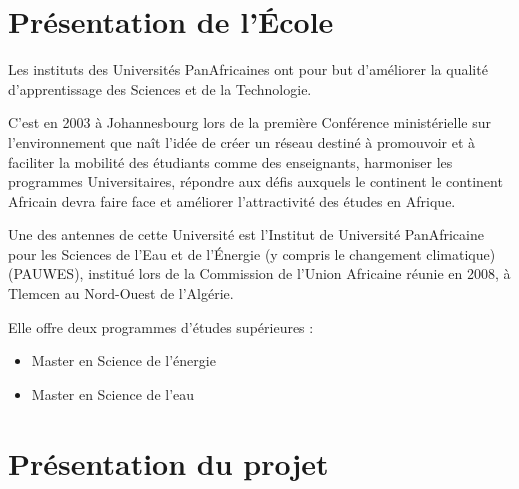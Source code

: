 \documentclass[oneside]{book}
\begin{document}
	\chapter{Présentation de l'École}
	{
	\par Les instituts des Universités PanAfricaines ont pour but d’améliorer la qualité d'apprentissage des Sciences et de la Technologie.
	\vspace{1cm}
	\par C’est en 2003 à Johannesbourg lors de la première Conférence ministérielle sur l’environnement que naît l’idée de créer un réseau destiné à promouvoir et à faciliter la mobilité des étudiants comme des enseignants, harmoniser les programmes Universitaires, répondre aux défis auxquels le continent le continent Africain devra faire face et améliorer l’attractivité des études en Afrique.
	\vspace{1cm}
	\par Une des antennes de cette Université est l’Institut de Université PanAfricaine pour les Sciences de l’Eau et de l'Énergie (y compris le changement climatique) (PAUWES), institué lors de la Commission de l’Union Africaine réunie en 2008, à Tlemcen au Nord-Ouest de l’Algérie. 
	\vspace{1cm}
	\par Elle offre deux programmes d’études supérieures :
		\begin{itemize}
			\item{Master en Science de l’énergie}
			\item{Master en Science de l’eau}
		\end{itemize}
	}
	\chapter{Présentation du projet}
	{
		
	}
\end{document}
